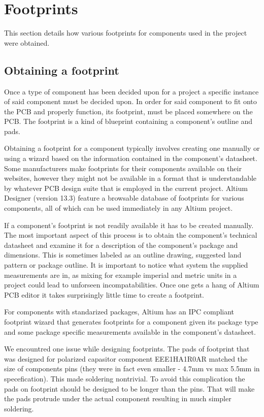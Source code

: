 \section{Footprints} \label{pcb:footprints}
This section details how various footprints for components used in the project were obtained.

\subsection{Obtaining a footprint}
Once a type of component has been decided upon for a project a specific instance of said component must be decided upon.
In order for said component to fit onto the PCB and properly function, its footprint, must be placed somewhere on the PCB.
The footprint is a kind of blueprint containing a component's outline and pads.

Obtaining a footprint for a component typically involves creating one manually or using a wizard based on the information contained in the component's datasheet.
Some manufacturers make footprints for their components available on their websites, however they might not be available in a format that is understandable by whatever PCB design suite that is employed in the current project.
Altium Designer (version 13.3) feature a browsable database of footprints for various components, all of which can be used immediately in any Altium project.

If a component's footprint is not readily available it has to be created manually.
The most important aspect of this process is to obtain the component's technical datasheet and examine it for a description of the component's package and dimensions.
This is sometimes labeled as an outline drawing, suggested land pattern or package outline.
It is important to notice what system the supplied measurements are in, as mixing for example imperial and metric units in a project could lead to unforseen incompatabilities.
Once one gets a hang of Altium PCB editor it takes surprisingly little time to create a footprint.

For components with standarized packages, Altium has an IPC compliant footprint wizard that generates footprints for a component given its package type and some package specific measurements available in the component's datasheet.


We encountred one issue while designing footprints.
The pads of footprint that was designed for polarized capasitor component EEE1HA1R0AR matched the size of components pins (they were in fact even smaller - 4.7mm vs max 5.5mm in specefication). 
This made soldering nontrivial.
To avoid this complication the pads on footprint should be designed to be longer than the pins.
That will make the pads protrude under the actual component resulting in much simpler soldering.

